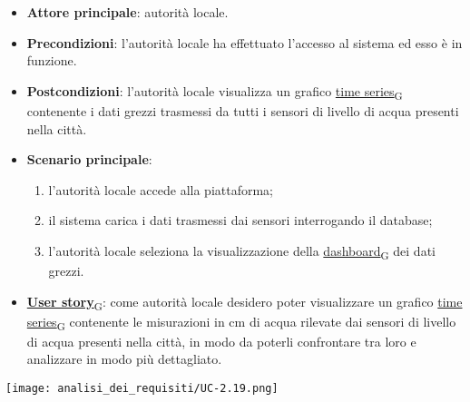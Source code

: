 \begin{itemize}
	\item \textbf{Attore principale}: autorità locale.
	\item \textbf{Precondizioni}: l'autorità locale ha effettuato l'accesso al sistema ed esso è in funzione.
	\item \textbf{Postcondizioni}: l'autorità locale visualizza un grafico \href{https://7last.github.io/docs/pb/documentazione-interna/glossario\#time-series}{time series\textsubscript{G}} contenente i dati grezzi trasmessi da tutti i sensori
	      di livello di acqua presenti nella città.
	\item \textbf{Scenario principale}:
	      \begin{enumerate}
		      \item l'autorità locale accede alla piattaforma;
		      \item il sistema carica i dati trasmessi dai sensori interrogando il database;
		      \item l'autorità locale seleziona la visualizzazione della \href{https://7last.github.io/docs/pb/documentazione-interna/glossario\#dashboard}{dashboard\textsubscript{G}} dei dati grezzi.
	      \end{enumerate}
	\item \href{https://7last.github.io/docs/pb/documentazione-interna/glossario\#user-story}{\textbf{User story}\textsubscript{G}}:
	      come autorità locale desidero poter visualizzare un grafico \href{https://7last.github.io/docs/pb/documentazione-interna/glossario\#time-series}{time series\textsubscript{G}} contenente le misurazioni in cm di acqua rilevate dai sensori
	      di livello di acqua presenti nella città, in modo da poterli confrontare tra loro e analizzare in modo più dettagliato.
\end{itemize}
\begin{center}
	\texttt{[image: analisi\_dei\_requisiti/UC-2.19.png]}
\end{center}


